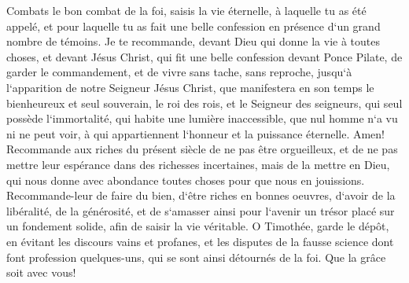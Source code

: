 \verse Combats le bon combat de la foi, saisis la vie éternelle, à laquelle tu as été appelé, et pour laquelle tu as fait une belle confession en présence d`un grand nombre de témoins. 
\verse Je te recommande, devant Dieu qui donne la vie à toutes choses, et devant Jésus Christ, qui fit une belle confession devant Ponce Pilate, de garder le commandement, 
\verse et de vivre sans tache, sans reproche, jusqu`à l`apparition de notre Seigneur Jésus Christ, 
\verse que manifestera en son temps le bienheureux et seul souverain, le roi des rois, et le Seigneur des seigneurs, 
\verse qui seul possède l`immortalité, qui habite une lumière inaccessible, que nul homme n`a vu ni ne peut voir, à qui appartiennent l`honneur et la puissance éternelle. Amen! 
\verse Recommande aux riches du présent siècle de ne pas être orgueilleux, et de ne pas mettre leur espérance dans des richesses incertaines, mais de la mettre en Dieu, qui nous donne avec abondance toutes choses pour que nous en jouissions. 
\verse Recommande-leur de faire du bien, d`être riches en bonnes oeuvres, d`avoir de la libéralité, de la générosité, 
\verse et de s`amasser ainsi pour l`avenir un trésor placé sur un fondement solide, afin de saisir la vie véritable. 
\verse O Timothée, garde le dépôt, en évitant les discours vains et profanes, 
\verse et les disputes de la fausse science dont font profession quelques-uns, qui se sont ainsi détournés de la foi. Que la grâce soit avec vous! 
